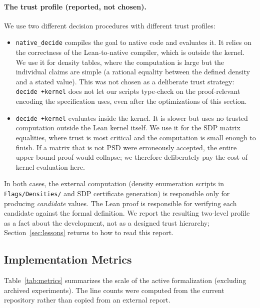 \documentclass{article}
\newcommand{\lean}[1]{\texttt{#1}}
\begin{document}
\paragraph{The trust profile (reported, not chosen).}
We use two different decision procedures with different trust profiles:
\begin{itemize}
  \item \lean{native\_decide} compiles the goal to native code and evaluates
    it.  It relies on the correctness of the Lean-to-native compiler, which
    is outside the kernel.  We use it for density tables, where the
    computation is large but the individual claims are simple (a rational
    equality between the defined density and a stated value).  This was not
    chosen as a deliberate trust strategy: \lean{decide +kernel} does not
    let our scripts type-check on the proof-relevant encoding the
    specification uses, even after the optimizations of this section.
  \item \lean{decide +kernel} evaluates inside the kernel.  It is slower but
    uses no trusted computation outside the Lean kernel itself.  We use it
    for the SDP matrix equalities, where trust is most critical and the
    computation is small enough to finish.  If a matrix that is not PSD were
    erroneously accepted, the entire upper bound proof would collapse; we
    therefore deliberately pay the cost of kernel evaluation here.
\end{itemize}
In both cases, the external computation (density enumeration scripts in
\lean{Flags/Densities/} and SDP certificate generation) is responsible only
for producing \emph{candidate} values.  The Lean proof is responsible for
verifying each candidate against the formal definition.  We report the
resulting two-level profile as a fact about the development, not as a
designed trust hierarchy; Section~\ref{sec:lessons} returns to how to read
this report.

\subsection{Implementation Metrics}

Table~\ref{tab:metrics} summarizes the scale of the active formalization
(excluding archived experiments).  The line counts were computed from the
current repository rather than copied from an external report.
\end{document}
